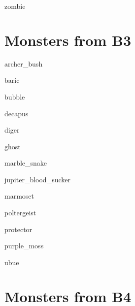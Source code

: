\documentclass[letterpaper,serif]{module}
\begin{document}
\begin{newmonster}{zombie}\end{newmonster}

\part{Monsters from B3}

\begin{newmonster}{archer_bush}\end{newmonster}
\begin{newmonster}{baric}\end{newmonster}
\begin{newmonster}{bubble}\end{newmonster}
\begin{newmonster}{decapus}\end{newmonster}
\begin{newmonster}{diger}\end{newmonster}
\begin{newmonster}{ghost}\end{newmonster}
\begin{newmonster}{marble_snake}\end{newmonster}
\begin{newmonster}{jupiter_blood_sucker}\end{newmonster}
\begin{newmonster}{marmoset}\end{newmonster}
\begin{newmonster}{poltergeist}\end{newmonster}
\begin{newmonster}{protector}\end{newmonster}
\begin{newmonster}{purple_moss}\end{newmonster}
\begin{newmonster}{ubue}\end{newmonster}

\part{Monsters from B4}
\end{document}
